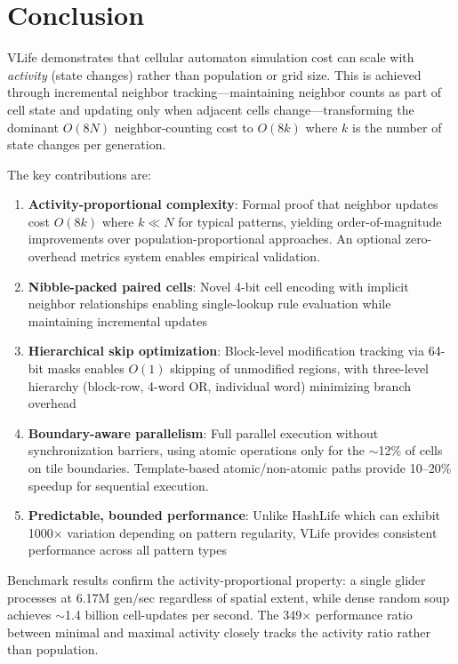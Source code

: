 \documentclass[11pt]{article}
\theoremstyle{definition}
\begin{document}
    \section{Conclusion}

    VLife demonstrates that cellular automaton simulation cost can scale with \emph{activity} (state changes) rather than population or grid size. This is achieved through incremental neighbor tracking---maintaining neighbor counts as part of cell state and updating only when adjacent cells change---transforming the dominant $O(8N)$ neighbor-counting cost to $O(8k)$ where $k$ is the number of state changes per generation.

    The key contributions are:

    \begin{enumerate}
        \item \textbf{Activity-proportional complexity}: Formal proof that neighbor updates cost $O(8k)$ where $k \ll N$ for typical patterns, yielding order-of-magnitude improvements over population-proportional approaches. An optional zero-overhead metrics system enables empirical validation.
        \item \textbf{Nibble-packed paired cells}: Novel 4-bit cell encoding with implicit neighbor relationships enabling single-lookup rule evaluation while maintaining incremental updates
        \item \textbf{Hierarchical skip optimization}: Block-level modification tracking via 64-bit masks enables $O(1)$ skipping of unmodified regions, with three-level hierarchy (block-row, 4-word OR, individual word) minimizing branch overhead
        \item \textbf{Boundary-aware parallelism}: Full parallel execution without synchronization barriers, using atomic operations only for the $\sim$12\% of cells on tile boundaries. Template-based atomic/non-atomic paths provide 10--20\% speedup for sequential execution.
        \item \textbf{Predictable, bounded performance}: Unlike HashLife which can exhibit 1000$\times$ variation depending on pattern regularity, VLife provides consistent performance across all pattern types
    \end{enumerate}

    Benchmark results confirm the activity-proportional property: a single glider processes at 6.17M gen/sec regardless of spatial extent, while dense random soup achieves $\sim$1.4 billion cell-updates per second. The 349$\times$ performance ratio between minimal and maximal activity closely tracks the activity ratio rather than population.
\end{document}
